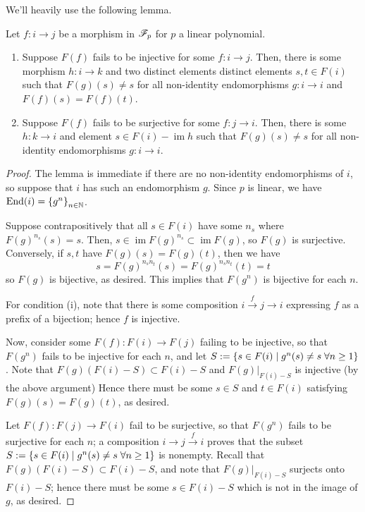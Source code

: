 \documentclass{amsart}
\begin{document}
We'll heavily use the following lemma.
\begin{lemma}\label{Nonfixed lemma}
  Let $f:i \rightarrow j$ be a morphism in $\mathscr{F}_p$ for $p$ a linear polynomial.
  \begin{enumerate}[label={(\roman*)}]
    \item Suppose $F(f)$ fails to be injective for some $f:i \rightarrow j$.
    Then, there is some morphism $h:i \rightarrow k$ and two distinct elements distinct elements $s,t \in F(i)$ such that $F(g)(s) \neq s$ for all non-identity endomorphisms $g:i \rightarrow i$ and $F(f)(s) = F(f)(t)$.
    \item Suppose $F(f)$ fails to be surjective for some $f:j \rightarrow i$.
      Then, there is some $h:k \rightarrow i$ and element $s \in F(i) - \operatorname{im} h$ such that $F(g)(s) \neq s$ for all non-identity endomorphisms $g:i \rightarrow i$.
  \end{enumerate}
\end{lemma}
\begin{proof}
  The lemma is immediate if there are no non-identity endomorphisms of $i$, so suppose that $i$ has such an endomorphism $g$.
  Since $p$ is linear, we have $\operatorname{End}(i) = \left\{ g^n \right\}_{n \in \mathbb{N}}$.
  
  Suppose contrapositively that all $s \in F(i)$ have some $n_s$ where $F(g)^{n_s}(s) = s$.
  Then, $s \in \operatorname{im} F(g)^{n_s} \subset \operatorname{im} F(g)$, so $F(g)$ is surjective.
  Conversely, if $s,t$ have $F(g)(s) = F(g)(t)$, then we have 
  \[
    s = F(g)^{n_sn_t}(s) = F(g)^{n_sn_t}(t) = t
  \]
  so $F(g)$ is bijective, as desired.
  This implies that $F(g^n)$ is bijective for each $n$.

  For condition (i), note that there is some composition $i \xrightarrow{f} j \rightarrow i$ expressing $f$ as a prefix of a bijection;
  hence $f$ is injective.

  Now, consider some $F(f):F(i) \rightarrow F(j)$ failing to be injective, so that $F(g^n)$ fails to be injective for each $n$, and let $S := \left\{ s \in F(i) \mid g^n(s) \neq s \; \forall n \geq 1 \right\}$.
  Note that $F(g)(F(i) - S) \subset F(i) - S$ and $F(g)|_{F(i) - S}$ is injective (by the above argument)
  Hence there must be some $s \in S$ and $t \in F(i)$ satisfying $F(g)(s) = F(g)(t)$, as desired.

  Let $F(f):F(j) \rightarrow F(i)$ fail to be surjective, so that $F(g^n)$ fails to be surjective for each $n$;
  a composition $i \rightarrow j \xrightarrow{f} i$ proves that the subset $S := \left\{ s \in F(i) \mid g^n(s) \neq s \; \forall n \geq 1 \right\}$ is nonempty.
  Recall that $F(g)(F(i) - S) \subset F(i) - S$, and note that $F(g)|_{F(i) - S}$ surjects onto $F(i) - S$;
  hence there must be some $s \in F(i) - S$ which is not in the image of $g$, as desired.
\end{proof}
\end{document}
